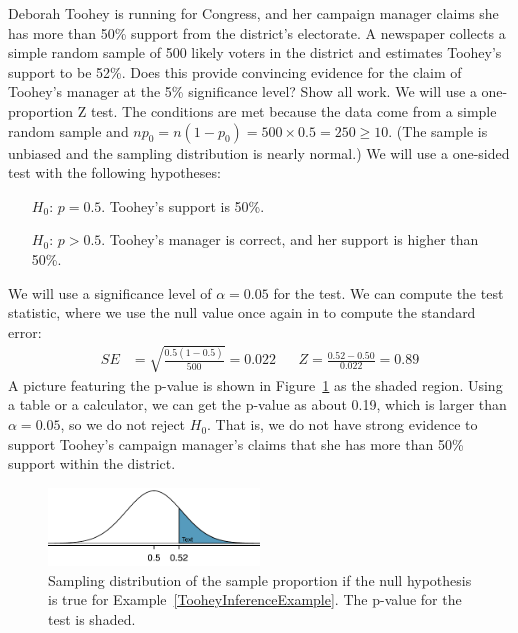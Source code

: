 \begin{example}{Deborah Toohey is running for Congress, and her campaign manager claims she has more than 50\% support from the district's electorate. A newspaper collects a simple random sample of 500 likely voters in the district and estimates Toohey's support to be 52\%. Does this provide convincing evidence for the claim of Toohey's manager at the 5\% significance level?  Show all work.} \label{TooheyInferenceExample}
We will use a one-proportion Z test.  The conditions are met because  the data come from a simple random sample and $np_0 = n(1-p_0) = 500 \times 0.5 = 250 \geq 10$.  (The sample is unbiased and the sampling distribution is nearly normal.)  We will use a one-sided test with the following hypotheses:
\begin{itemize}
\item[$H_0$:] $p = 0.5$. Toohey's support is 50\%.
\item[$H_0$:] $p > 0.5$. Toohey's manager is correct, and her support is higher than 50\%.
\end{itemize}
We will use a significance level of $\alpha = 0.05$ for the test. We can compute the test statistic, where we use the null value once again in to compute the standard error:
\begin{align*}
SE&=\sqrt{\frac{0.5(1-0.5)}{500}}=0.022
&&Z = \frac{0.52 - 0.50}{0.022} = 0.89
\end{align*}
A picture featuring the p-value is shown in Figure~\ref{pValueForCampaignManagerClaimOfMoreThan50PercentSupport} as the shaded region. Using a table or a calculator, we can get the p-value as about 0.19, which is larger than $\alpha = 0.05$, so we do not reject $H_0$. That is, we do not have strong evidence to support Toohey's campaign manager's claims that she has more than 50\% support within the district.
\end{example}

\begin{figure}[h]
\centering
\includegraphics[width=0.5\textwidth]{ch_inference_for_props/figures/pValueForCampaignManagerClaimOfMoreThan50PercentSupport/pValueForCampaignManagerClaimOfMoreThan50PercentSupport}
\caption{Sampling distribution of the sample proportion if the null hypothesis is true for Example~\ref{TooheyInferenceExample}. The p-value for the test is shaded.}
\label{pValueForCampaignManagerClaimOfMoreThan50PercentSupport}
\end{figure}

